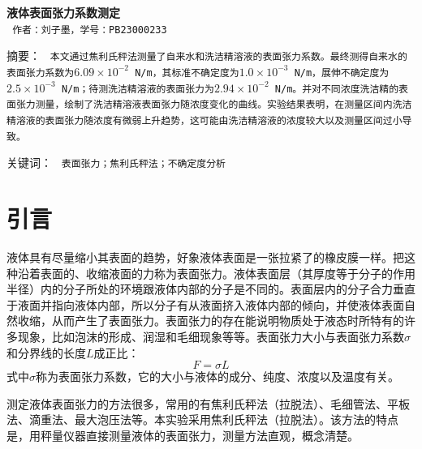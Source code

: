 \documentclass[a4paper]{extarticle}
\begin{document}
    \begin{center}
        \textbf{\fontsize{22pt}{\baselineskip} \selectfont 液体表面张力系数测定}\\
        \vspace{2em}
        \texttt{\fontsize{14pt}{\baselineskip} \selectfont 作者：刘子墨，学号：PB23000233}\\
    \end{center}
    \vspace{2em}
    \hspace{2em}\textsf{\fontsize{9pt}{\baselineskip} \selectfont 摘要：}
    \texttt{\fontsize{9pt}{\baselineskip} \selectfont 本文通过焦利氏秤法测量了自来水和洗洁精溶液的表面张力系数。最终测得自来水的表面张力系数为$6.09\times10^{-2}$ N/m，其标准不确定度为$1.0\times10^{-3}$ N/m，展伸不确定度为$2.5\times10^{-3}$ N/m；待测洗洁精溶液的表面张力为$2.94\times10^{-2}$ N/m。并对不同浓度洗洁精的表面张力测量，绘制了洗洁精溶液表面张力随浓度变化的曲线。实验结果表明，在测量区间内洗洁精溶液的表面张力随浓度有微弱上升趋势，这可能由洗洁精溶液的浓度较大以及测量区间过小导致。}
    \par\hspace{2em}\textsf{\fontsize{9pt}{\baselineskip} \selectfont 关键词：}
    \texttt{\fontsize{9pt}{\baselineskip} \selectfont 表面张力；焦利氏秤法；不确定度分析}\\ 
    \section{引言}
    \hspace{2em}
    液体具有尽量缩小其表面的趋势，好象液体表面是一张拉紧了的橡皮膜一样。把这种沿着表面的、收缩液面的力称为表面张力。液体表面层（其厚度等于分子的作用半径）内的分子所处的环境跟液体内部的分子是不同的。表面层内的分子合力垂直于液面并指向液体内部，所以分子有从液面挤入液体内部的倾向，并使液体表面自然收缩，从而产生了表面张力。表面张力的存在能说明物质处于液态时所特有的许多现象，比如泡沫的形成、润湿和毛细现象等等。表面张力大小与表面张力系数$σ$和分界线的长度$L$成正比：
    \begin{equation}
        F=\sigma L
    \end{equation}
    式中$\sigma$称为表面张力系数，它的大小与液体的成分、纯度、浓度以及温度有关。
    \par\hspace{2em}
    测定液体表面张力的方法很多，常用的有焦利氏秤法（拉脱法）、毛细管法、平板法、滴重法、最大泡压法等。本实验采用焦利氏秤法（拉脱法）。该方法的特点是，用秤量仪器直接测量液体的表面张力，测量方法直观，概念清楚。
\end{document}
